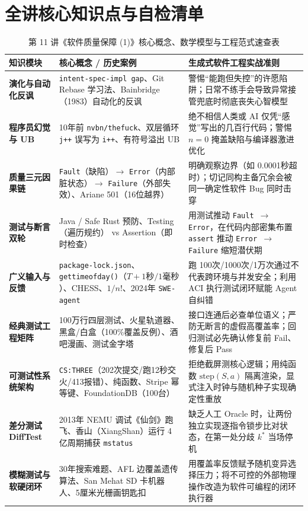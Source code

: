 \documentclass[a4paper]{article}
\begin{document}
\section*{全讲核心知识点与自检清单}

\begin{table}[H]
\centering
\small
\caption{第 11 讲《软件质量保障 (1)》核心概念、数学模型与工程范式速查表}
\begin{tabular}{p{2.8cm}p{4.6cm}p{5.9cm}}
\toprule
\textbf{知识模块} & \textbf{核心概念 / 历史案例} & \textbf{生成式软件工程实战准则} \\
\midrule
\textbf{演化与自动化反讽} & \texttt{intent-spec-impl gap}、Git Rebase 学习法、Bainbridge（1983）自动化的反讽 & 警惕“能跑但失控”的许愿陷阱；日常不练手会导致异常接管兜底时彻底丧失心智模型 \\
\textbf{程序员幻觉与 UB} & 10年前 \texttt{nvbn/thefuck}、双层循环 \texttt{j++} 误写为 \texttt{i++}、有符号溢出 UB & 绝不相信人类或 AI 仅凭“感觉”写出的几百行代码；警惕 $n=0$ 掩盖缺陷与编译器激进优化 \\
\textbf{质量三元因果链} & \texttt{Fault}（缺陷）$\to$ \texttt{Error}（内部脏状态）$\to$ \texttt{Failure}（外部失效）、Ariane 501（16位越界） & 明确观察边界（如 0.0001秒超时）；切记同构主备冗余会被同一确定性软件 Bug 同时击穿 \\
\textbf{测试与断言双轮} & Java / Safe Rust 预防、Testing（遍历规约） vs Assertion（即时检查） & 用测试推动 \texttt{Fault $\to$ Error}，在代码内部密集布置 \texttt{assert} 推动 \texttt{Error $\to$ Failure} 缩短潜伏期 \\
\textbf{广义输入与反馈} & \texttt{package-lock.json}、\texttt{gettimeofday()}（$T+1\text{秒}/1\text{毫秒}$）、CHESS、$1/n!$、2024年 \texttt{SWE-agent} & 跑 100次/1000次/1万次通过不代表跨环境与并发安全；利用 ACI 执行测试闭环赋能 Agent 自纠错 \\
\textbf{经典测试工程矩阵} & 100万行四层测试、火星轨道器、黑盒/白盒（100\%覆盖反例）、酒吧漫画、测试金字塔 & 接口连通后必查单位语义；严防无断言的虚假高覆盖率；回归测试必先确认修复前 Fail、修复后 Pass \\
\textbf{可测试性系统架构} & \texttt{CS:THREE}（202次提交/跑12秒交火/413报错）、纯函数、Stripe 幂等键、FoundationDB（100台） & 拒绝截屏测核心逻辑；用纯函数 $\mathrm{step}(S,a)$ 隔离渲染，显式注入时钟与随机种子实现确定性重放 \\
\textbf{差分测试 DiffTest} & 2013年 NEMU 调试《仙剑》跑飞、香山（XiangShan）运行 4 亿周期捕获 \texttt{mstatus} & 缺乏人工 Oracle 时，让两份独立实现逐指令锁步比对状态，在第一处分歧 $k^*$ 当场停机 \\
\textbf{模糊测试与软硬闭环} & 30年搜索难题、AFL 边覆盖遗传算法、San Mehat SD 卡机器人、5厘米光栅画钥匙扣 & 用覆盖率反馈赋予随机变异选择压力；将不可控的外部物理操作改造为软件可编程的闭环执行器 \\
\bottomrule
\end{tabular}
\end{table}
\end{document}
